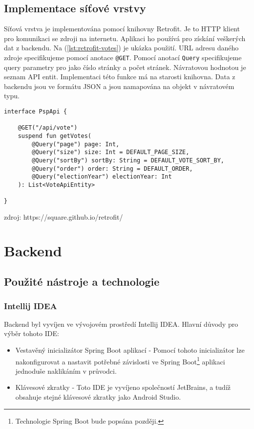 \subsection{Implementace síťové vrstvy}

\noindent Síťová vrstva je implementována pomocí knihovny Retrofit. Je to HTTP klient pro komunikaci se zdroji na internetu. Aplikaci ho používá pro získání veškerých dat z backendu. Na (\ref{lst:retrofit-votes}) je ukázka použití. URL adresu daného zdroje specifikujeme pomocí anotace \lstinline|@GET|. Pomocí anotací \lstinline|Query| specifikujeme query parametry pro jako číslo stránky a počet stránek. Návratovou hodnotou je seznam API entit. Implementaci této funkce má na starosti knihovna. Data z backendu jsou ve formátu JSON a jsou namapována na objekt v návratovém typu.

\begin{lstlisting}[caption={Ukázka použití knihovny Retrofit pro získání seznamu hlasování z backendu}, label={lst:retrofit-votes}, tabsize=2]
interface PspApi {
	
	@GET("/api/vote")
	suspend fun getVotes(
		@Query("page") page: Int,
		@Query("size") size: Int = DEFAULT_PAGE_SIZE,
		@Query("sortBy") sortBy: String = DEFAULT_VOTE_SORT_BY,
		@Query("order") order: String = DEFAULT_ORDER,
		@Query("electionYear") electionYear: Int
	): List<VoteApiEntity>
	
}
\end{lstlisting}

zdroj: https://square.github.io/retrofit/

\section{Backend}

\subsection {Použité nástroje a technologie}
\subsubsection*{Intellij IDEA}
Backend byl vyvíjen ve vývojovém prostředí Intellij IDEA. Hlavní důvody pro výběr tohoto IDE:

\begin{itemize}
	\item Vestavěný inicializátor Spring Boot aplikací - Pomocí tohoto inicializátor lze nakonfigurovat a nastavit potřebné závislosti ve Spring Boot\footnote{Technologie Spring Boot bude popsána později.} aplikaci jednoduše naklikáním v průvodci.
	
	\item Klávesové zkratky - Toto IDE je vyvíjeno společností JetBrains, a tudíž obsahuje stejné klávesové zkratky jako Android Studio.
\end{itemize}

